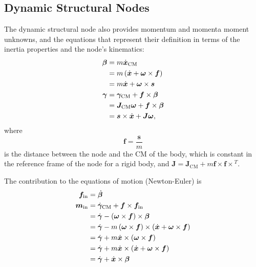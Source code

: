\documentclass[10pt,dvips,fleqn,subeqn]{report}
\newcommand{\T}[1]{\bm{#1}}
\newcommand{\TT}[1]{\bm{#1}}
\begin{document}
\subsection{Dynamic Structural Nodes}
\label{sec:nodes:structural nodes:dynamic structural nodes}
The dynamic structural node also provides momentum and momenta moment
unknowns, and the equations that represent their definition
in terms of the inertia properties and the node's kinematics:
\begin{subequations}
\label{eq:body:momenta}
\begin{align}
	\T{\beta}
	&= m \dot{\T{x}}_{\text{CM}} \nonumber \\
	&= m \plbr{\dot{\T{x}} + \T{\omega}\times\T{f}} \nonumber \\
	&= m \dot{\T{x}} + \T{\omega} \times \T{s}
	\label{eq:body:momentum} \\
	\T{\gamma}
	&= \T{\gamma}_{\text{CM}} + \T{f} \times\T{\beta} \nonumber \\
	&= \TT{J}_{\text{CM}} \T{\omega} + \T{f} \times\T{\beta} \nonumber \\
	&= \T{s} \times \dot{\T{x}} + \TT{J} \T{\omega}
	\label{eq:body:momenta-moment} ,
\end{align}
\end{subequations}
where
\begin{equation}
	\T{f} = \frac{\T{s}}{m}
\end{equation}
is the distance between the node and the CM of the body,
which is constant in the reference frame of the node
for a rigid body,
and $\TT{J} = \TT{J}_\text{CM} + m \T{f}\times \T{f} \times{}^T$.

The contribution to the equations of motion (Newton-Euler) is
\begin{subequations}
\label{eq:body:newton-euler}
\begin{align}
	\T{f}_{\text{in}} &= \dot{\T{\beta}}
	\label{eq:body:newton-euler:f}
	\\
	\T{m}_{\text{in}} &= \dot{\T{\gamma}}_{\text{CM}} + \T{f}\times\T{f}_{\text{in}} \nonumber \\
	&= \dot{\T{\gamma}} - \plbr{\T{\omega}\times\T{f}}\times\T{\beta} \nonumber \\
	&= \dot{\T{\gamma}} - m \plbr{\T{\omega}\times\T{f}}\times\plbr{\dot{\T{x}} + \T{\omega}\times\T{f}} \nonumber \\
	&= \dot{\T{\gamma}} + m \dot{\T{x}}\times\plbr{\T{\omega}\times\T{f}} \nonumber \\
	&= \dot{\T{\gamma}} + m \dot{\T{x}}\times\plbr{\dot{\T{x}} + \T{\omega}\times\T{f}} \nonumber \\
	&= \dot{\T{\gamma}} + \dot{\T{x}}\times\T{\beta}
	\label{eq:body:newton-euler:m}
\end{align}
\end{subequations}
\end{document}
